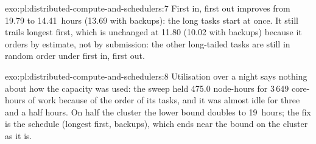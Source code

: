 \begin{solution}{exo:pl:distributed-compute-and-schedulers:7}
First in, first out improves from 19.79 to 14.41~hours (13.69 with backups): the long tasks start at once. It still trails longest first,
which is unchanged at 11.80 (10.02 with backups) because it orders by estimate, not by submission: the other long-tailed tasks are still in
random order under first in, first out.
\end{solution}

\begin{solution}{exo:pl:distributed-compute-and-schedulers:8}
Utilisation over a night says nothing about how the capacity was used: the sweep held 475.0 node-hours for 3\,649 core-hours of work because of
the order of its tasks, and it was almost idle for three and a half hours. On half the cluster the lower bound doubles to 19~hours; the fix is the
schedule (longest first, backups), which ends near the bound on the cluster as it is.
\end{solution}

